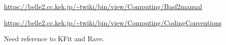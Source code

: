 \begin{thebibliography}{99}

\url{https://belle2.cc.kek.jp/~twiki/bin/view/Computing/Basf2manual}

\url{https://belle2.cc.kek.jp/~twiki/bin/view/Computing/CodingConventions}
 
Need reference to KFit and Rave.

\end{thebibliography}
